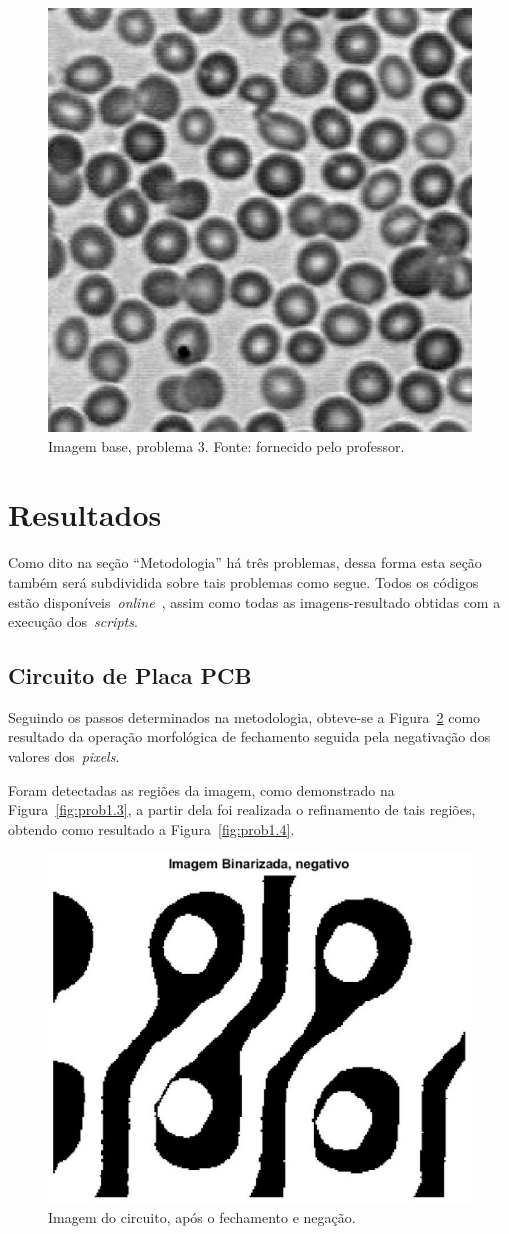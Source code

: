 \documentclass[conference]{Trabalho_2}
\begin{document}
\begin{figure}[!t]
  \centering
  \includegraphics[width = 4.5 cm]{img_cells}
  \caption{Imagem base, problema $3$. Fonte: fornecido pelo professor.}
  \label{fig:prob3.1}
\end{figure}



\section{Resultados}
Como dito na se\c{c}\~ao ``Metodologia'' h\'a tr\^es problemas, dessa forma esta se\c{c}\~ao tamb\'em ser\'a subdividida sobre tais problemas como segue. Todos os c\'odigos est\~ao dispon\'iveis~\textit{online}~\cite{down}, assim como todas as imagens-resultado obtidas com a execu\c{c}\~ao dos~\textit{scripts}.

\subsection{Circuito de Placa PCB}
Seguindo os passos determinados na metodologia, obteve-se a Figura~\ref{fig:prob1.2} como resultado da opera\c{c}\~ao morfol\'ogica de fechamento seguida pela negativa\c{c}\~ao dos valores dos~\textit{pixels}.

Foram detectadas as regi\~oes da imagem, como demonstrado na Figura~\ref{fig:prob1.3}, a partir dela foi realizada o refinamento de tais regi\~oes, obtendo como resultado a Figura~\ref{fig:prob1.4}.

\begin{figure}[!t]
  \centering
  \includegraphics[width = 4.5 cm]{Imagem_Binarizada_negativo}
  \caption{Imagem do circuito, ap\'os o fechamento e nega\c{c}\~ao.}
  \label{fig:prob1.2}
\end{figure}
\end{document}
